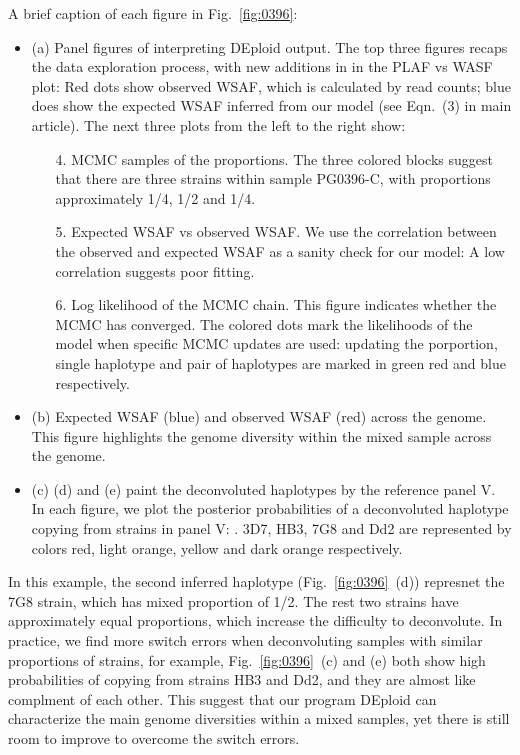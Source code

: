 A brief caption of each figure in Fig.~\ref{fig:0396}:
\begin{itemize}

\item (a) Panel figures of interpreting {\textmd DEploid} output. The top three figures recaps the data exploration process, with new additions in in the PLAF vs WASF plot: Red dots show observed WSAF, which is calculated by read counts; blue does show the expected WSAF inferred from our model (see Eqn.~(3) in main article). The next three plots from the left to the right show:
\begin{enumerate}
\item[4.] MCMC samples of the proportions. The three colored blocks suggest that there are three strains within sample {\textmd PG0396-C}, with proportions approximately 1/4, 1/2 and 1/4.
\item[5.] Expected WSAF vs observed WSAF. We use the correlation between the observed and expected WSAF as a sanity check for our model: A low correlation suggests poor fitting.
\item[6.] Log likelihood of the MCMC chain. This figure indicates whether the MCMC has converged. The colored dots mark the likelihoods of the model when specific MCMC updates are used: updating the porportion, single haplotype and pair of haplotypes are marked in green red and blue respectively.

\end{enumerate}
\item (b) Expected WSAF (blue) and observed WSAF (red) across the genome. This figure highlights the genome diversity within the mixed sample across the genome.
\item (c) (d) and (e) paint the deconvoluted haplotypes by the reference panel V. In each figure, we plot the posterior probabilities of a deconvoluted haplotype copying from strains in panel V:  .
3D7, HB3, 7G8 and Dd2 are represented by colors red, light orange, yellow and dark orange respectively.
\end{itemize}

In this example, the second inferred haplotype (Fig.~\ref{fig:0396}~(d)) represnet the 7G8 strain, which has mixed proportion of 1/2. The rest two strains have approximately equal proportions, which increase the difficulty to deconvolute. In practice, we find more switch errors when deconvoluting samples with similar proportions of strains, for example, Fig.~\ref{fig:0396}~(c) and (e) both show high probabilities of copying from strains HB3 and Dd2, and they are almost like complment of each other. This suggest that our program DEploid can characterize the main genome diversities within a mixed samples, yet there is still room to improve to overcome the switch errors.

